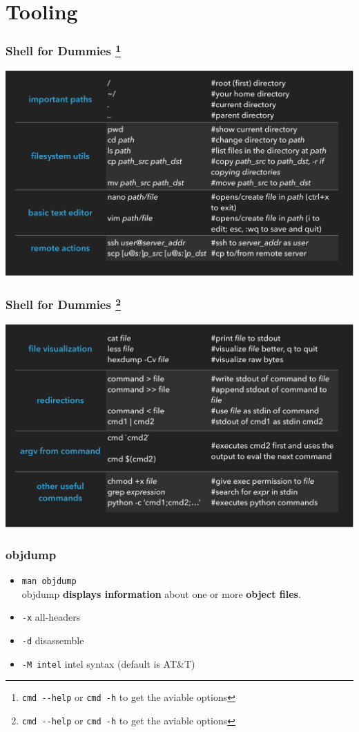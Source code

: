\documentclass[]{beamer}
\begin{document}
\section{Tooling}
\begin{frame}
  \frametitle{Shell for Dummies \footnote{\texttt{cmd -{}-help} or \texttt{cmd -h} to get the aviable options}}
  \hspace*{-11mm}
  \includegraphics[width=\paperwidth]{./images/shell_1.pdf}
\end{frame}

\begin{frame}
  \frametitle{Shell for Dummies \footnote{\texttt{cmd -{}-help} or \texttt{cmd -h} to get the aviable options}}
  \hspace*{-11mm}
  \includegraphics[width=\paperwidth]{./images/shell_2.pdf}
\end{frame}

\begin{frame}
  \frametitle{objdump}
  \begin{itemize}
  \item{{\tt man objdump}}\\
objdump \textbf{displays information} about one or more \textbf{object files}.
  \item{\texttt{-x}} all-headers
  \item{\texttt{-d}} disassemble
  \item{\texttt{-M intel}} intel syntax (default is AT\&T)
  \end{itemize}
\end{frame}
\end{document}
